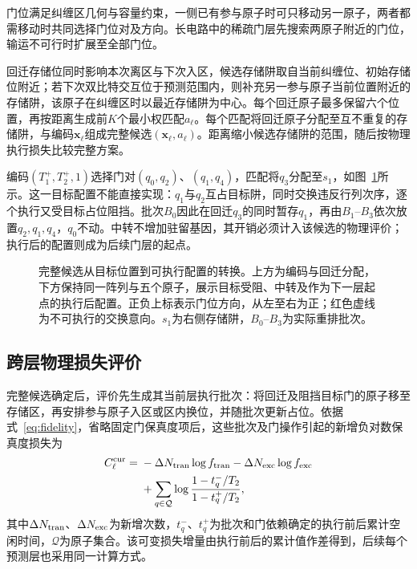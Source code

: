 门位满足纠缠区几何与容量约束，一侧已有参与原子时可只移动另一原子，两者都需移动时共同选择门位对及方向。长电路中的稀疏门层先搜索两原子附近的门位，输运不可行时扩展至全部门位。

回迁存储位同时影响本次离区与下次入区，候选存储阱取自当前纠缠位、初始存储位附近；若下次双比特交互位于预测范围内，则补充另一参与原子当前位置附近的存储阱，该原子在纠缠区时以最近存储阱为中心。每个回迁原子最多保留六个位置，再按距离生成前$K$个最小权匹配$a_\ell$\cite{murty1968assignment}。每个匹配将回迁原子分配至互不重复的存储阱，与编码$\mathbf x_\ell$组成完整候选$(\mathbf x_\ell,a_\ell)$。距离缩小候选存储阱的范围，随后按物理执行损失比较完整方案。

编码$(T_1^+,T_2^+,1)$选择门对$(q_0,q_2)$、$(q_1,q_4)$，匹配将$q_3$分配至$s_1$，如图~\ref{fig:joint-ga}所示。这一目标配置不能直接实现：$q_1$与$q_2$互占目标阱，同时交换违反行列次序，逐个执行又受目标占位阻挡。批次$B_0$因此在回迁$q_3$的同时暂存$q_1$，再由$B_1$--$B_3$依次放置$q_2,q_1,q_4$，$q_0$不动。中转不增加驻留基因，其开销必须计入该候选的物理评价；执行后的配置则成为后续门层的起点。

\begin{figure}[!t]
  \centering
  \resizebox{\columnwidth}{!}{}
  \caption{完整候选从目标位置到可执行配置的转换。上方为编码与回迁分配，下方保持同一阵列与五个原子，展示目标受阻、中转及作为下一层起点的执行后配置。正负上标表示门位方向，从左至右为正；红色虚线为不可执行的交换意向。$s_1$为右侧存储阱，$B_0$--$B_3$为实际重排批次。}
  \label{fig:joint-ga}
\end{figure}

\subsection{跨层物理损失评价}

完整候选确定后，评价先生成其当前层执行批次：将回迁及阻挡目标门的原子移至存储区，再安排参与原子入区或区内换位，并随批次更新占位。依据式~\eqref{eq:fidelity}，省略固定门保真度项后，这些批次及门操作引起的新增负对数保真度损失为
\begin{equation}
\begin{aligned}
C_\ell^{\rm cur}={}&-\Delta N_{\rm tran}\log f_{\rm tran}
-\Delta N_{\rm exc}\log f_{\rm exc}\\
&+\sum_{q\in\mathcal Q}
\log\frac{1-t_q^{-}/T_2}{1-t_q^{+}/T_2},
\end{aligned}
\label{eq:current-cost}
\end{equation}
其中$\Delta N_{\rm tran}$、$\Delta N_{\rm exc}$为新增次数，$t_q^{-}$、$t_q^{+}$为批次和门依赖确定的执行前后累计空闲时间，$\mathcal Q$为原子集合。该可变损失增量由执行前后的累计值作差得到，后续每个预测层也采用同一计算方式。


